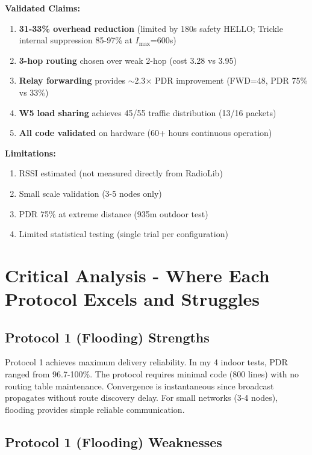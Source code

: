 \textbf{Validated Claims:}

\begin{enumerate}
\item \textbf{31-33\% overhead reduction} (limited by 180s safety HELLO; Trickle internal suppression 85-97\% at $I_{\max}$=600s)
\item \textbf{3-hop routing} chosen over weak 2-hop (cost 3.28 vs 3.95)
\item \textbf{Relay forwarding} provides $\sim$2.3$\times$ PDR improvement (FWD=48, PDR 75\% vs 33\%)
\item \textbf{W5 load sharing} achieves 45/55 traffic distribution (13/16 packets)
\item \textbf{All code validated} on hardware (60+ hours continuous operation)
\end{enumerate}

\textbf{Limitations:}
\begin{enumerate}
\item RSSI estimated (not measured directly from RadioLib)
\item Small scale validation (3-5 nodes only)
\item PDR 75\% at extreme distance (935m outdoor test)
\item Limited statistical testing (single trial per configuration)
\end{enumerate}

\section{Critical Analysis - Where Each Protocol Excels and Struggles}

\subsection{Protocol 1 (Flooding) Strengths}

Protocol 1 achieves maximum delivery reliability. In my 4 indoor tests, PDR ranged from 96.7-100\%. The protocol requires minimal code (800 lines) with no routing table maintenance. Convergence is instantaneous since broadcast propagates without route discovery delay. For small networks (3-4 nodes), flooding provides simple reliable communication.

\subsection{Protocol 1 (Flooding) Weaknesses}


